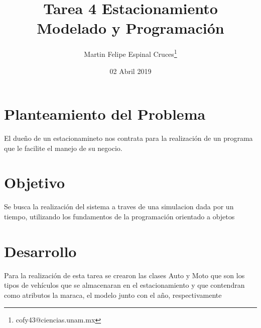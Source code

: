 \documentclass[10pt]{article}
\begin{document}
\title{Tarea 4 Estacionamiento\\
Modelado y Programación}

\author{Martin Felipe Espinal Cruces\thanks{cofy43@ciencias.unam.mx}}

\date{02 Abril 2019}
\maketitle

\section{Planteamiento del Problema}

El dueño de un estacionamineto nos contrata para la realización de
un programa que le facilite el manejo de su negocio.

\section{Objetivo}

Se busca la realización del sistema a traves de una simulacion dada
por un tiempo, utilizando los fundamentos de la programación orientado
a objetos

\section{Desarrollo }

Para la realización de esta tarea se crearon las clases Auto y Moto que 
son los tipos de vehículos que se almacenaran en el estacionamiento y que 
contendran como atributos la maraca, el modelo junto con el año, respectivamente
\end{document}
